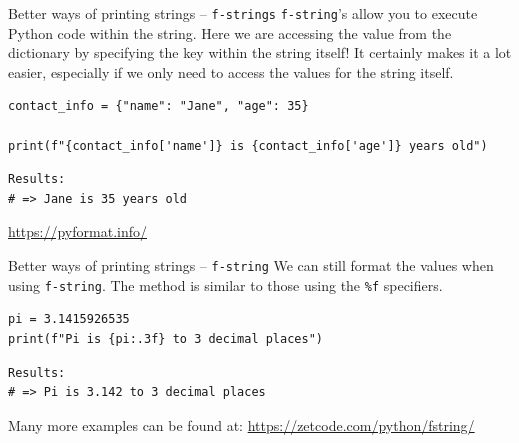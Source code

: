 \documentclass[10pt]{beamer}
\begin{document}
\begin{frame}[label={sec:orgda4f8dd},fragile]{Better ways of printing strings -- \texttt{f-strings}}
 \texttt{f-string}'s allow you to execute Python code within the string. Here we are accessing
the value from the dictionary by specifying the key within the string itself! It
certainly makes it a lot easier, especially if we only need to access the values for
the string itself.

\begin{verbatim}
contact_info = {"name": "Jane", "age": 35}

print(f"{contact_info['name']} is {contact_info['age']} years old")
\end{verbatim}

\begin{verbatim}
Results: 
# => Jane is 35 years old
\end{verbatim}


\url{https://pyformat.info/}
\end{frame}

\begin{frame}[label={sec:org75f2809},fragile]{Better ways of printing strings -- \texttt{f-string}}
 We can still format the values when using \texttt{f-string}. The method is similar to those
using the \texttt{\%f} specifiers.

\begin{verbatim}
pi = 3.1415926535
print(f"Pi is {pi:.3f} to 3 decimal places")
\end{verbatim}

\begin{verbatim}
Results: 
# => Pi is 3.142 to 3 decimal places
\end{verbatim}


Many more examples can be found at: \url{https://zetcode.com/python/fstring/}
\end{frame}
\end{document}
